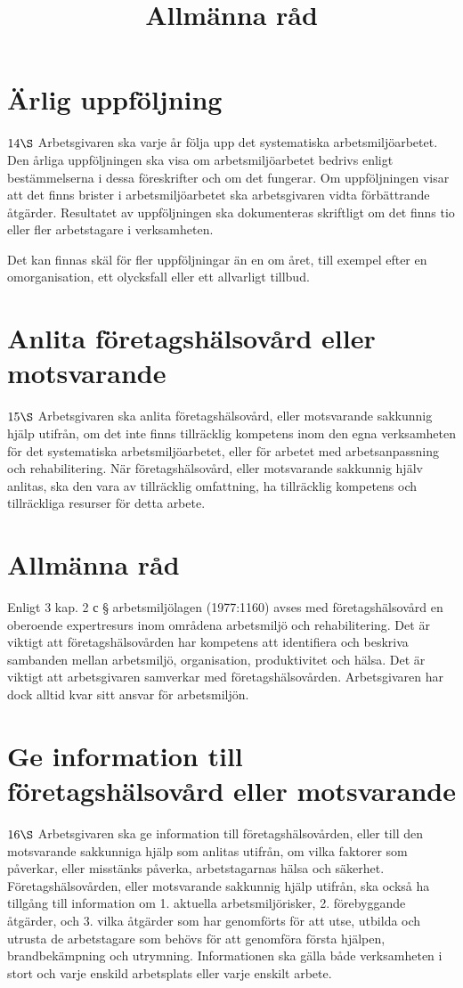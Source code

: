 \section*{Ärlig uppföljning}
\(14 \S\) Arbetsgivaren ska varje år följa upp det systematiska arbetsmiljöarbetet. Den årliga uppföljningen ska visa om arbetsmiljöarbetet bedrivs enligt bestämmelserna i dessa föreskrifter och om det fungerar.
Om uppföljningen visar att det finns brister i arbetsmiljöarbetet ska arbetsgivaren vidta förbättrande åtgärder.
Resultatet av uppföljningen ska dokumenteras skriftligt om det finns tio eller fler arbetstagare i verksamheten.

\title{
Allmänna råd
}
Det kan finnas skäl för fler uppföljningar än en om året, till exempel efter en omorganisation, ett olycksfall eller ett allvarligt tillbud.
\section*{Anlita företagshälsovård eller motsvarande}
\(15 \S\) Arbetsgivaren ska anlita företagshälsovård, eller motsvarande sakkunnig hjälp utifrån, om det inte finns tillräcklig kompetens inom den egna verksamheten för det systematiska arbetsmiljöarbetet, eller för arbetet med arbetsanpassning och rehabilitering.
När företagshälsovård, eller motsvarande sakkunnig hjälv anlitas, ska den vara av tillräcklig omfattning, ha tillräcklig kompetens och tillräckliga resurser för detta arbete.
\section*{Allmänna råd}
Enligt 3 kap. 2 с § arbetsmiljölagen (1977:1160) avses med företagshälsovård en oberoende expertresurs inom områdena arbetsmiljö och rehabilitering. Det är viktigt att företagshälsovården har kompetens att identifiera och beskriva sambanden mellan arbetsmiljö, organisation, produktivitet och hälsa.
Det är viktigt att arbetsgivaren samverkar med företagshälsovården. Arbetsgivaren har dock alltid kvar sitt ansvar för arbetsmiljön.
\section*{Ge information till företagshälsovård eller motsvarande}
\(16 \S\) Arbetsgivaren ska ge information till företagshälsovården, eller till den motsvarande sakkunniga hjälp som anlitas utifrån, om vilka faktorer som påverkar, eller misstänks påverka, arbetstagarnas hälsa och säkerhet.
Företagshälsovården, eller motsvarande sakkunnig hjälp utifrån, ska också ha tillgång till information om
1. aktuella arbetsmiljörisker,
2. förebyggande åtgärder, och
3. vilka åtgärder som har genomförts för att utse, utbilda och utrusta de arbetstagare som behövs för att genomföra första hjälpen, brandbekämpning och utrymning.
Informationen ska gälla både verksamheten i stort och varje enskild arbetsplats eller varje enskilt arbete.

